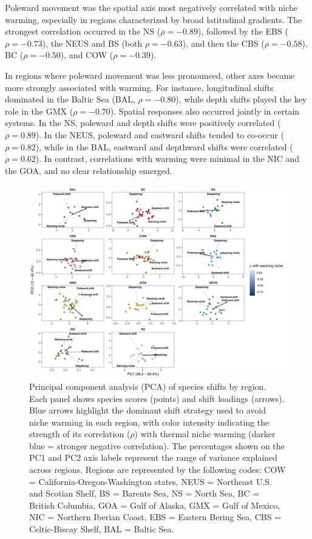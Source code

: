 \documentclass[11pt]{article}
\begin{document}
\begin{spacing}{1.5}
Poleward movement was the spatial axis most negatively correlated with niche warming, especially in regions characterized by broad latitudinal gradients. The strongest correlation occurred in the NS ($\rho = -0.89$), followed by the EBS ($\rho = -0.73$), the NEUS and BS (both $\rho = -0.63$), and then the CBS ($\rho = -0.58$), BC ($\rho = -0.50$), and COW ($\rho = -0.39$).

In regions where poleward movement was less pronounced, other axes became more strongly associated with warming. For instance, longitudinal shifts dominated in the Baltic Sea (BAL, $\rho = -0.80$), while depth shifts played the key role in the GMX ($\rho = -0.70$).
Spatial responses also occurred jointly in certain systems. In the NS, poleward and depth shifts were positively correlated ($\rho = 0.89$). In the NEUS, poleward and eastward shifts tended to co-occur ($\rho = 0.82$), while in the BAL, eastward and depthward shifts were correlated ($\rho = 0.62$).
In contrast, correlations with warming were minimal in the NIC and the GOA, and no clear relationship emerged.

\begin{figure}[h]
    \centering
        \includegraphics[scale=0.6]{images/pca.png}
    \caption{Principal component analysis (PCA) of species shifts by region. Each panel shows species scores (points) and shift loadings (arrows). Blue arrows highlight the dominant shift strategy used to avoid niche warming in each region, with color intensity indicating the strength of its correlation ($\rho$) with thermal niche warming (darker blue = stronger negative correlation). The percentages shown on the PC1 and PC2 axis labels represent the range of variance explained across regions. Regions are represented by the following codes:
COW = California-Oregon-Washington states, NEUS = Northeast U.S. and Scotian Shelf, BS = Barents Sea, NS = North Sea, BC = British Columbia, GOA = Gulf of Alaska, GMX = Gulf of Mexico, NIC = Northern Iberian Coast, EBS = Eastern Bering Sea,
CBS = Celtic-Biscay Shelf,
BAL = Baltic Sea.
}
    \label{fig:pca}
\end{figure}


\end{spacing}
\end{document}
